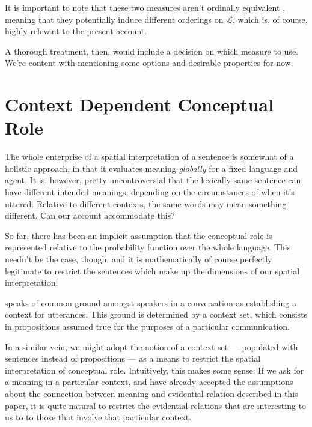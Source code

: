 \documentclass[11pt, a4paper]{scrartcl}
\renewcommand{\i}[1]{\emph{#1}}
\renewcommand{\L}{\mathcal{L}}
\begin{document}
It is important to note that these two measures aren't ordinally equivalent \parencite[364]{Fitelson1999-FITTPO-3}, meaning that they potentially induce different orderings on $\L$, which is, of course, highly relevant to the present account.

A thorough treatment, then, would include a decision on which measure to use. We're content with mentioning some options and desirable properties for now. 

\section{Context Dependent Conceptual Role}

The whole enterprise of a spatial interpretation of a sentence is somewhat of a holistic approach, in that it evaluates meaning \i{globally} for a fixed language and agent. It is, however, pretty uncontroversial that the lexically same sentence can have different intended meanings, depending on the circumstances of when it's uttered. Relative to different contexts, the same words may mean something different. Can our account accommodate this? 

So far, there has been an implicit assumption that the conceptual role is represented relative to the probability function over the whole language. This needn't be the case, though, and it is mathematically of course perfectly legitimate to restrict the sentences which make up the dimensions of our spatial interpretation. 

\textcite{Stalnaker1978-STAA-2} speaks of common ground amongst speakers in a conversation as establishing a context for utterances. This ground is determined by a context set, which consists in propositions assumed true for the purposes of a particular communication.

In a similar vein, we might adopt the notion of a context set --- populated with sentences instead of propositions --- as a means to restrict the spatial interpretation of conceptual role. Intuitively, this makes some sense: If we ask for a meaning in a particular context, and have already accepted the assumptions about the connection between meaning and evidential relation described in this paper, it is quite natural to restrict the evidential relations that are interesting to us to to those that involve that particular context.
\end{document}
